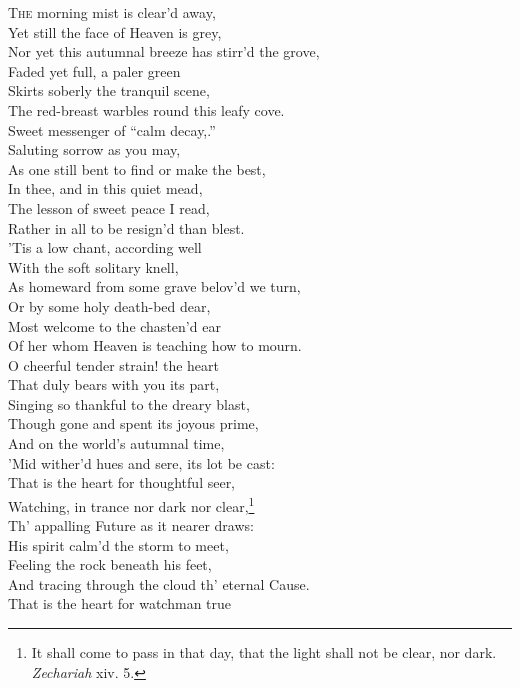 \textsc{The} morning mist is clear’d away, \\
 Yet still the face of Heaven is grey, \\
 Nor yet this autumnal breeze has stirr’d the grove, \\
 Faded yet full, a paler green \\
 Skirts soberly the tranquil scene, \\
 The red-breast warbles round this leafy cove. \\
  Sweet messenger of “calm decay,.” \\
 Saluting sorrow as you may, \\
 As one still bent to find or make the best, \\
 In thee, and in this quiet mead, \\
 The lesson of sweet peace I read, \\
 Rather in all to be resign’d than blest. \\
  ’Tis a low chant, according well \\
 With the soft solitary knell, \\
 As homeward from some grave belov’d we turn, \\
 Or by some holy death-bed dear, \\
 Most welcome to the chasten’d ear \\
 Of her whom Heaven is teaching how to mourn. \\
  O cheerful tender strain! the heart \\
 That duly bears with you its part, \\
 Singing so thankful to the dreary blast, \\
 Though gone and spent its joyous prime, \\
 And on the world’s autumnal time, \\
 ’Mid wither’d hues and sere, its lot be cast: \\
  That is the heart for thoughtful seer, \\
 Watching, in trance nor dark nor clear,\footnote{It shall come to pass in that day, that the light shall not be clear, nor dark. \emph{Zechariah} xiv. 5.} \\
 Th’ appalling Future as it nearer draws: \\
 His spirit calm’d the storm to meet, \\
 Feeling the rock beneath his feet, \\
 And tracing through the cloud th’ eternal Cause. \\
  That is the heart for watchman true \\

